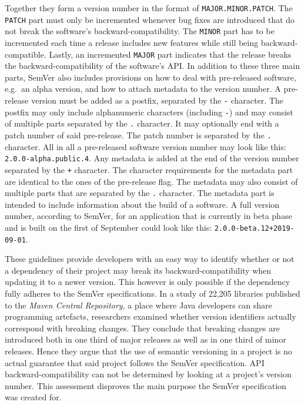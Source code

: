 Together they form a version number in the format of
\texttt{MAJOR.MINOR.PATCH}. The \texttt{PATCH} part must only be incremented
whenever bug fixes are introduced that do not break the software's
backward-compatibility. The \texttt{MINOR} part has to be incremented each
time a release includes new features while still being backward-compatible.
Lastly, an incremented \texttt{MAJOR} part indicates that the release breaks
the backward-compatibility of the software's \ac{API}. In addition to these
three main parts, SemVer also includes provisions on how to deal with
pre-released software, e.g.\ an alpha version, and how to attach metadata to
the version number. A pre-release version must be added as a postfix,
separated by the \texttt{-} character. The postfix may only include
alphanumeric characters (including \texttt{-}) and may consist of multiple
parts separated by the \texttt{.} character. It may optionally end with a patch
number of said pre-release. The patch number is separated by the \texttt{.}
character. All in all a pre-released software version number may look like
this: \texttt{2.0.0-alpha.public.4}. Any metadata is added at the end of the
version number separated by the \texttt{+} character. The character
requirements for the metadata part are identical to the ones of the pre-release
flag. The metadata may also consist of multiple parts that are separated by the
\texttt{.} character. The metadata part is intended to include information
about the build of a software. A full version number, according to SemVer, for
an application that is currently in beta phase and is built on the first of
September could look like this: \texttt{2.0.0-beta.12+2019-09-01}.

These guidelines provide developers with an easy way to identify whether or not
a dependency of their project may break its backward-compatibility when
updating it to a newer version. This however is only possible if the dependency
fully adheres to the SemVer specifications. In a study
\autocite{RaemaekersSemanticVersioningversus2014} of 22,205 libraries published
to the \textit{Maven Central Repository}, a place where Java developers can
share programming artefacts, researchers examined whether version identifiers
actually correspond with breaking changes. They conclude that breaking changes
are introduced both in one third of major releases as well as in one third of
minor releases. Hence they argue that the use of semantic versioning in a
project is no actual guarantee that said project follows the SemVer
specification. \ac{API} backward-compatibility can not be determined by looking
at a project's version number. This assessment disproves the main purpose the
SemVer specification was created for.

